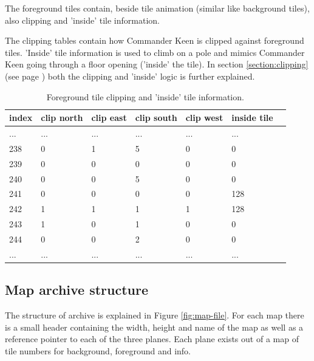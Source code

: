 \documentclass[book.tex]{subfiles}
\begin{document}
  \par
The foreground tiles contain, beside tile animation (similar like background tiles), also clipping and 'inside' tile information.\\
\par
The clipping tables contain how Commander Keen is clipped against foreground tiles. 'Inside' tile information is used to climb on a pole and mimics Commander Keen going through a floor opening ('inside' the tile). In section \ref{section:clipping} (see page \pageref{section:clipping}) both the clipping and 'inside' logic is further explained.\\
\begin{table}[H]
  \begin{tabularx}{\textwidth}[c]{XXXXXXX}
  \hline
  \textbf{index} & \textbf{clip north} & \textbf{clip east} & \textbf{clip south} & \textbf{clip west}  & \textbf{inside tile} \\ \hline
  ...    & ...     & ...    & ...   & ...     & ...      \\
  238    & 0       & 1      & 5     & 0       & 0        \\
  239    & 0       & 0      & 0     & 0       & 0        \\
  240    & 0       & 0      & 5     & 0       & 0        \\
  241    & 0       & 0      & 0     & 0       & 128       \\
  242    & 1       & 1      & 1     & 1       & 128       \\
  243    & 1       & 0      & 1     & 0       & 0       \\
  244    & 0       & 0      & 2     & 0       & 0       \\
  ...    & ...     & ...    & ...   & ...     & ...     \\
  \end{tabularx}
  \caption{Foreground tile clipping and 'inside' tile information.}
  \end{table}


\pagebreak
 
\subsection{Map archive structure}
The structure of  archive is explained in Figure \ref{fig:map-file}. For each map there is a small header containing the width, height and name of the map as well as a reference pointer to each of the three planes. Each plane exists out of a map of tile numbers for background, foreground and info.\\
\end{document}
